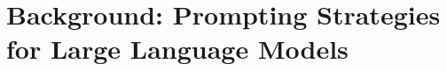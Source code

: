 \documentclass[11pt,a4paper]{article}
\begin{document}
\section{Background: Prompting Strategies for Large Language Models}





\end{document}
